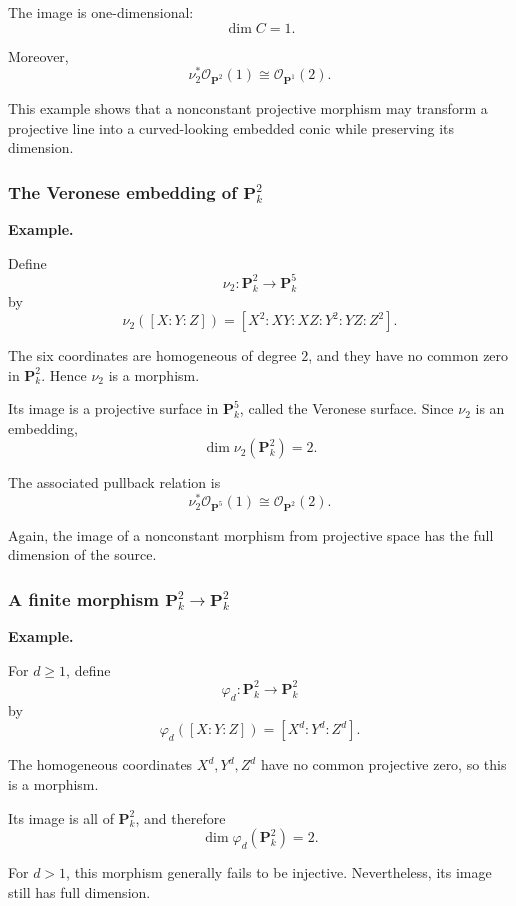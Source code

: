 \documentclass[12pt,a4paper]{article}
\theoremstyle{notespace}
\begin{document}
The image is one-dimensional:
\[
\dim C=1.
\]

Moreover,
\[
\nu_2^*\mathcal O_{\mathbf P^2}(1)
\cong
\mathcal O_{\mathbf P^1}(2).
\]

This example shows that a nonconstant projective morphism may transform a projective line into a curved-looking embedded conic while preserving its dimension.

\subsubsection{The Veronese embedding of \(\mathbf P^2_k\)}

\textbf{Example.}

Define
\[
\nu_2:\mathbf P^2_k\longrightarrow\mathbf P^5_k
\]
by
\[
\nu_2([X:Y:Z])
=
[X^2:XY:XZ:Y^2:YZ:Z^2].
\]

The six coordinates are homogeneous of degree \(2\), and they have no common zero in \(\mathbf P^2_k\). Hence \(\nu_2\) is a morphism.

Its image is a projective surface in \(\mathbf P^5_k\), called the Veronese surface. Since \(\nu_2\) is an embedding,
\[
\dim\nu_2(\mathbf P^2_k)=2.
\]

The associated pullback relation is
\[
\nu_2^*\mathcal O_{\mathbf P^5}(1)
\cong
\mathcal O_{\mathbf P^2}(2).
\]

Again, the image of a nonconstant morphism from projective space has the full dimension of the source.

\subsubsection{\texorpdfstring{A finite morphism \(\mathbf P^2_k\to\mathbf P^2_k\)}{A finite morphism P2 to P2}}

\textbf{Example.}

For \(d\geq1\), define
\[
\varphi_d:\mathbf P^2_k\longrightarrow\mathbf P^2_k
\]
by
\[
\varphi_d([X:Y:Z])
=
[X^d:Y^d:Z^d].
\]

The homogeneous coordinates \(X^d,Y^d,Z^d\) have no common projective zero, so this is a morphism.

Its image is all of \(\mathbf P^2_k\), and therefore
\[
\dim\varphi_d(\mathbf P^2_k)=2.
\]

For \(d>1\), this morphism generally fails to be injective. Nevertheless, its image still has full dimension.
\end{document}
